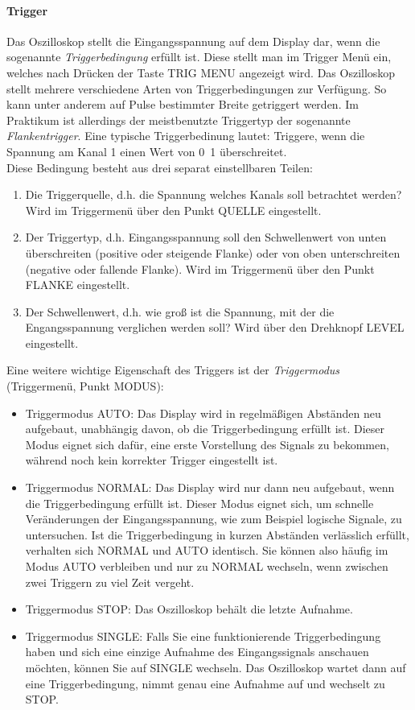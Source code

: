   \paragraph{Trigger} 
  Das Oszilloskop stellt die Eingangsspannung auf dem Display dar, wenn die sogenannte \textit{Triggerbedingung} erfüllt ist. Diese stellt man im Trigger Menü ein, welches nach Drücken der Taste TRIG MENU angezeigt wird. 
  Das Oszilloskop stellt mehrere verschiedene Arten von Triggerbedingungen zur Verfügung. So kann unter anderem auf Pulse bestimmter Breite getriggert werden. Im Praktikum ist allerdings der meistbenutzte Triggertyp der sogenannte \textit{Flankentrigger}. Eine typische Triggerbedinung lautet: Triggere, wenn die Spannung am Kanal 1 einen Wert von \unit{0.1}{\volt} überschreitet.\\
  Diese Bedingung besteht aus drei separat einstellbaren Teilen:
  \begin{enumerate}
    \item Die Triggerquelle, d.h. die Spannung welches Kanals soll betrachtet werden? Wird im Triggermenü über den Punkt QUELLE eingestellt.
    \item Der Triggertyp, d.h. Eingangsspannung soll den Schwellenwert von unten überschreiten (positive oder steigende Flanke) oder von oben unterschreiten (negative oder fallende Flanke). Wird im Triggermenü über den Punkt FLANKE eingestellt.
    \item Der Schwellenwert, d.h. wie groß ist die Spannung, mit der die Engangsspannung verglichen werden soll? Wird über den Drehknopf LEVEL eingestellt.
  \end{enumerate}
  Eine weitere wichtige Eigenschaft des Triggers ist der \textit{Triggermodus} (Triggermenü, Punkt MODUS):
  \begin{itemize}
    \item Triggermodus AUTO: Das Display wird in regelmäßigen Abständen neu aufgebaut, unabhängig davon, ob die Triggerbedingung erfüllt ist. Dieser Modus eignet sich dafür, eine erste Vorstellung des Signals zu bekommen, während noch kein korrekter Trigger eingestellt ist.
    \item Triggermodus NORMAL: Das Display wird nur dann neu aufgebaut, wenn die Triggerbedingung erfüllt ist. Dieser Modus eignet sich, um schnelle Veränderungen der Eingangsspannung, wie zum Beispiel logische Signale, zu untersuchen.
      Ist die Triggerbedingung in kurzen Abständen verlässlich erfüllt,
      verhalten sich NORMAL und AUTO identisch. Sie können also häufig im
      Modus AUTO verbleiben und nur zu NORMAL wechseln, wenn zwischen
      zwei Triggern zu viel Zeit vergeht.
    \item
      Triggermodus STOP: Das Oszilloskop beh\"alt die letzte Aufnahme.
    \item
      Triggermodus SINGLE: Falls Sie eine funktionierende Triggerbedingung haben
      und sich eine einzige Aufnahme des Eingangssignals anschauen m\"ochten,
      k\"onnen Sie auf SINGLE wechseln. Das Oszilloskop wartet dann auf eine
      Triggerbedingung, nimmt genau eine Aufnahme auf und wechselt zu STOP.
  \end{itemize}
	
